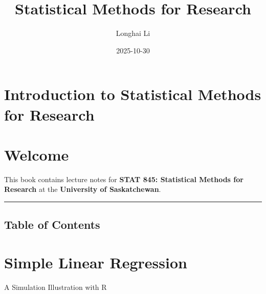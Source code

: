 \documentclass[
  letterpaper,
  DIV=11,
  numbers=noendperiod]{scrreprt}
\title{Statistical Methods for Research}
\author{Longhai Li}
\date{2025-10-30}
\newenvironment{Shaded}{\begin{snugshade}}{\end{snugshade}}
\newcommand{\AttributeTok}[1]{\textcolor[rgb]{0.40,0.45,0.13}{#1}}
\newcommand{\ConstantTok}[1]{\textcolor[rgb]{0.56,0.35,0.01}{#1}}
\newcommand{\DecValTok}[1]{\textcolor[rgb]{0.68,0.00,0.00}{#1}}
\newcommand{\FunctionTok}[1]{\textcolor[rgb]{0.28,0.35,0.67}{#1}}
\newcommand{\NormalTok}[1]{\textcolor[rgb]{0.00,0.23,0.31}{#1}}
\newcommand{\SpecialCharTok}[1]{\textcolor[rgb]{0.37,0.37,0.37}{#1}}
\newcommand{\StringTok}[1]{\textcolor[rgb]{0.13,0.47,0.30}{#1}}
\renewcommand*\contentsname{Table of contents}
\newcommand\contentsname{Table of contents}
\begin{document}
\maketitle

\renewcommand*\contentsname{Table of contents}
{
\hypersetup{linkcolor=}
\setcounter{tocdepth}{2}
\tableofcontents
}

\section{Introduction to Statistical Methods for
Research}\label{introduction-to-statistical-methods-for-research}

\section*{Welcome}\label{welcome}


This book contains lecture notes for \textbf{STAT 845: Statistical
Methods for Research} at the \textbf{University of Saskatchewan}.

\begin{center}\rule{0.5\linewidth}{0.5pt}\end{center}

\subsection*{Table of Contents}\label{table-of-contents}

\label{book-toc}

\section{Simple Linear Regression}\label{simple-linear-regression}

A Simulation Illustration with R

\hfill\break

\begin{Shaded}
\end{Shaded}
\end{document}
